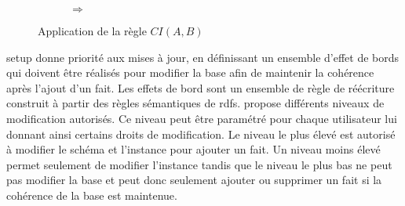 \begin{figure}[htb]
    \centering
    \begin{subfigure}{.4\textwidth}
        \centering
        \begin{adjustbox}{valign=c, max width=\textwidth}
        \end{adjustbox}
    \end{subfigure}
    \hfill
    \begin{subfigure}{.1\textwidth}
        \centering
        \huge{$\Longrightarrow$}
    \end{subfigure}
    \hfill
    \begin{subfigure}{.4\textwidth}
        \centering
        \begin{adjustbox}{valign=c, max width=\textwidth}
        \end{adjustbox}
    \end{subfigure}
    \caption{Application de la règle $CI(A,B)$}
    \label{fig:rule_ci}
\end{figure}

\gls{setup} donne priorité aux mises à jour, en définissant un ensemble d'effet de bords qui doivent être réalisés pour modifier la base afin de maintenir la cohérence après l'ajout d'un fait.
Les effets de bord sont un ensemble de règle de réécriture construit à partir des règles sémantiques de \gls{rdfs}.
\cite{chabinUsingGraphGrammar2019} propose différents niveaux de modification autorisés.
Ce niveau peut être paramétré pour chaque utilisateur lui donnant ainsi certains droits de modification.
Le niveau le plus élevé est autorisé à modifier le schéma et l'instance pour ajouter un fait.
Un niveau moins élevé permet seulement de modifier l'instance tandis que le niveau le plus bas ne peut pas modifier la base et peut donc seulement ajouter ou supprimer un fait si la cohérence de la base est maintenue.

